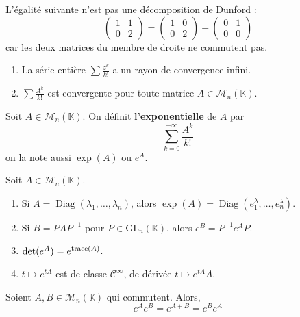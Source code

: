 	\begin{cexample}
		L'égalité suivante n'est pas une décomposition de Dunford :
		\[ \begin{pmatrix} 1 & 1 \\ 0 & 2 \end{pmatrix} = \begin{pmatrix} 1 & 0 \\ 0 & 2 \end{pmatrix} + \begin{pmatrix} 0 & 1 \\ 0 & 0 \end{pmatrix} \]
		car les deux matrices du membre de droite ne commutent pas.
	\end{cexample}
	
	
	\begin{lemma}
		\begin{enumerate}[label=(\roman*)]
			\item La série entière $\sum \frac{z^k}{k!}$ a un rayon de convergence infini.
			\item $\sum \frac{A^k}{k!}$ est convergente pour toute matrice $A \in \mathcal{M}_n(\mathbb{K})$.
		\end{enumerate}
	\end{lemma}
	
	\begin{definition}
		Soit $A \in \mathcal{M}_n(\mathbb{K})$. On définit \textbf{l'exponentielle} de $A$ par
		\[ \sum_{k=0}^{+\infty} \frac{A^k}{k!} \]
		on la note aussi $\exp(A)$ ou $e^A$.
	\end{definition}
	
	\begin{theorem}
		Soit $A \in \mathcal{M}_n(\mathbb{K})$.
		\begin{enumerate}[label=(\roman*)]
			\item Si $A = \operatorname{Diag}(\lambda_1, \dots, \lambda_n)$, alors $\exp(A) = \operatorname{Diag}(e^\lambda_1, \dots, e^\lambda_n)$.
			\item Si $B = PAP^{-1}$ pour $P \in \mathrm{GL}_n(\mathbb{K})$, alors $e^B = P^{-1} e^A P$.
			\item $\det(e^A) = e^{\operatorname{trace}(A)}$.
			\item $t \mapsto e^{tA}$ est de classe $\mathcal{C}^\infty$, de dérivée $t \mapsto e^{tA}A$.
		\end{enumerate}
	\end{theorem}
	
	\begin{proposition}
		Soient $A, B \in \mathcal{M}_n(\mathbb{K})$ qui commutent. Alors,
		\[ e^A e^B = e^{A+B} = e^B e^A \]
	\end{proposition}
	

